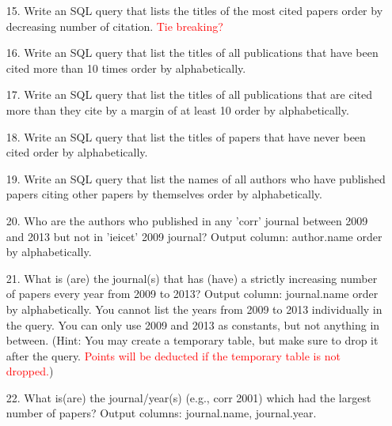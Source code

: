 \documentclass[10pt]{article}
\begin{document}
\begin{enumerate}
\item
[15.] Write an SQL query that lists the titles of the most cited papers order by decreasing number of citation. \textcolor{red}{Tie breaking?}
\item
[16.] Write an SQL query that  list the titles of all publications that have been cited more than 10 times order by alphabetically.  
\item
[17.] Write an SQL query that list the titles of all publications that are cited more than they cite by a margin of at least 10 order by alphabetically. 
\item
[18.] Write an SQL query that list the titles of papers that have never been cited order by alphabetically.
\item
[19.] Write an SQL query that list the names of all authors who have published papers citing other papers by themselves order by alphabetically. 
\item
[20.] Who are the authors who published in any 'corr' journal between 2009 and 2013 but not in 'ieicet' 2009 journal? Output column: author.name order by alphabetically.
\item 
[21.] What is (are) the journal(s) that has (have) a strictly increasing number of papers every year from 2009 to 2013? Output column: journal.name order by alphabetically. You cannot list the years from 2009 to 2013 individually in the query. You can only use 2009 and 2013 as constants, but not anything in between. (Hint: You may create a temporary table, but make sure to drop it after the query. \textcolor{red}{Points will be deducted if the temporary table is not dropped.})
\item 
[22.] What is(are) the journal/year(s) (e.g., corr 2001) which had the largest number of papers? Output columns: journal.name, journal.year. 

\end{enumerate}
\end{document}
